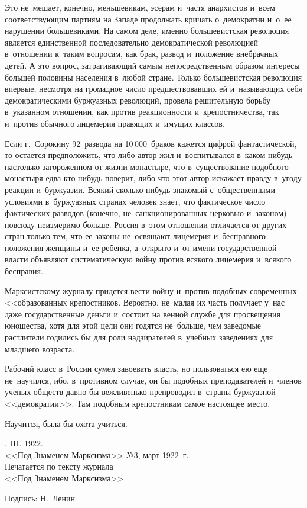 Это не~мешает, конечно, меньшевикам, эсерам и~частя анархистов и~всем соответствующим партиям на Западе продолжать кричать о~демократии и~о~ее нарушении большевиками. На самом деле, именно большевистская революция является единственной последовательно демократической революцией в~отношении к~таким вопросам, как брак, развод и~положение внебрачных детей. А это вопрос, затрагивающий самым непосредственным образом интересы большей половины населения в~любой стране. Только большевистская революция впервые, несмотря на громадное число предшествовавших ей и~называющих себя демократическими буржуазных революций, провела решительную борьбу в~указанном отношении, как против реакционности и~крепостничества, так и~против обычного лицемерия правящих и~имущих классов.

Если г.~Сорокину 92~развода на 10\,000~браков кажется цифрой фантастической, то остается предположить, что либо автор жил и~воспитывался в~каком-нибудь настолько загороженном от жизни монастыре, что в~существование подобного монастыря едва кто-нибудь поверит, либо что этот автор искажает правду в~угоду реакции и~буржуазии. Всякий сколько-нибудь знакомый с~общественными условиями в~буржуазных странах человек знает, что фактическое число фактических разводов (конечно, не~санкционированных церковью и~законом) повсюду неизмеримо больше. Россия в~этом отношении отличается от других стран только тем, что ее законы не~освящают лицемерия и~бесправного положения женщины и~ее ребенка, а~открыто и~от имени государственной власти объявляют систематическую войну против всякого лицемерия и~всякого бесправия.

Марксистскому журналу придется вести войну и~против подобных современных <<образованных крепостников. Вероятно, не~малая их часть получает у~нас даже государственные деньги и~состоит на венной службе для просвещения юношества, хотя для этой цели они годятся не~больше, чем заведомые растлители годились бы для роли надзирателей в~учебных заведениях для младшего возраста.

Рабочий класс в~России сумел завоевать власть, но пользоваться ею еще не~научился, ибо, в~противном случае, он бы подобных преподавателей и~членов ученых обществ давно бы вежливенько препроводил в~страны буржуазной <<демократии>>. Там подобным крепостникам самое настоящее место.

Научится, была бы охота учиться.

\bigskip

. III. 1922. \\
<<Под Знаменем Марксизма>> №3, март 1922~г. \\
Печатается по тексту журнала \\
<<Под Знаменем Марксизма>>

\bigskip

\noindent Подпись: Н.~Ленин
